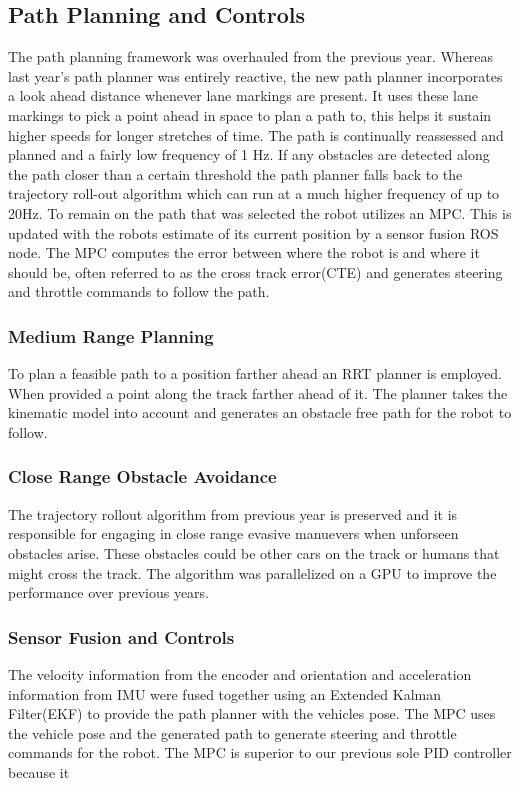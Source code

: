 \documentclass[11pt,journal]{IEEEtran}
\begin{document}
\subsection{Path Planning and Controls}
The path planning framework was overhauled from the previous year. Whereas last year's path planner was entirely reactive, the new path planner incorporates a look ahead distance whenever lane markings are present. It uses these lane markings to pick a point ahead in space to plan a path to, this helps it sustain higher speeds for longer stretches of time. The path is continually reassessed and planned and a fairly low frequency of 1 Hz. If any obstacles are detected along the path closer than a certain threshold the path planner falls back to the trajectory roll-out algorithm which can run at a much higher frequency of up to 20Hz.
To remain on the path that was selected the robot utilizes an MPC. This is updated with the robots estimate of its current position by a sensor fusion ROS node. The MPC computes the error between where the robot is and where it should be, often referred to as the cross track error(CTE) and generates steering and throttle commands to follow the path.

\subsubsection{Medium Range Planning}
To plan a feasible path to a position farther ahead an RRT planner is employed. When provided a point along the track farther ahead of it. The planner takes the kinematic model into account and generates an obstacle free path for the robot to follow.

\subsubsection{Close Range Obstacle Avoidance}
The trajectory rollout algorithm from previous year is preserved and it is responsible for engaging in close range evasive manuevers when unforseen obstacles arise. These obstacles could be other cars on the track or humans that might cross the track. The algorithm was parallelized on a GPU to improve the performance over previous years.

\subsubsection{Sensor Fusion and Controls}
The velocity information from the encoder and orientation and acceleration information from IMU were fused together using an Extended Kalman Filter(EKF) to provide the path planner with the vehicles pose. The MPC uses the vehicle pose and the generated path to generate steering and throttle commands for the robot. The MPC is superior to our previous sole PID controller because it 
\end{document}

